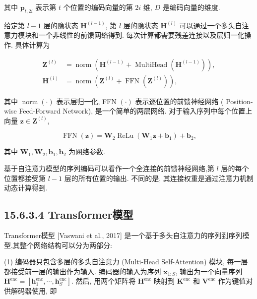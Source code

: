 \documentclass[10pt]{article}
\begin{document}
其中 $\boldsymbol{p}_{t, 2 i}$ 表示第 $t$ 个位置的编码向量的第 $2 i$ 维, $D$ 是编码向量的维度.

给定第 $l-1$ 层的隐状态 $\boldsymbol{H}^{(l-1)}$, 第 $l$ 层的隐状态 $\boldsymbol{H}^{(l)}$ 可以通过一个多头自注意力模块和一个非线性的前馈网络得到. 每次计算都需要残差连接以及层归一化操作. 具体计算为


\begin{align*}
\boldsymbol{Z}^{(l)} & =\operatorname{norm}\left(\boldsymbol{H}^{(l-1)}+\operatorname{MultiHead}\left(\boldsymbol{H}^{(l-1)}\right)\right),  \tag{15.115}\\
\boldsymbol{H}^{(l)} & =\operatorname{norm}\left(\boldsymbol{Z}^{(l)}+\operatorname{FFN}\left(\boldsymbol{Z}^{(l)}\right)\right), \tag{15.116}
\end{align*}


其中 $\operatorname{norm}(\cdot)$ 表示层归一化, FFN $(\cdot)$ 表示逐位置的前馈神经网络 ( Position-wise Feed-Forward Network), 是一个简单的两层网络. 对于输入序列中每个位置上向量 $\boldsymbol{z} \in \boldsymbol{Z}^{(l)}$,


\begin{equation*}
\operatorname{FFN}(\boldsymbol{z})=\boldsymbol{W}_{2} \operatorname{ReLu}\left(\boldsymbol{W}_{1} \boldsymbol{z}+\boldsymbol{b}_{1}\right)+\boldsymbol{b}_{2}, \tag{15.117}
\end{equation*}


其中 $\boldsymbol{W}_{1}, \boldsymbol{W}_{2}, \boldsymbol{b}_{1}, \boldsymbol{b}_{2}$ 为网络参数.

基于自注意力模型的序列编码可以看作一个全连接的前馈神经网络,第 $l$ 层的每个位置都接受第 $l-1$ 层的所有位置的输出. 不同的是, 其连接权重是通过注意力机制动态计算得到.

\subsection*{15.6.3.4 Transformer模型}
Transformer模型 [Vaswani et al., 2017] 是一个基于多头自注意力的序列到序列模型,其整个网络结构可以分为两部分:

(1) 编码器只包含多层的多头自注意力 (Multi-Head Self-Attention) 模块, 每一层都接受前一层的输出作为输入. 编码器的输入为序列 $\boldsymbol{x}_{1: S}$, 输出为一个向量序列 $\boldsymbol{H}^{\mathrm{enc}}=\left[\boldsymbol{h}_{1}^{\mathrm{enc}}, \cdots, \boldsymbol{h}_{S}^{\mathrm{enc}}\right]$. 然后, 用两个矩阵将 $\boldsymbol{H}^{\mathrm{enc}}$ 映射到 $\boldsymbol{K}^{\mathrm{enc}}$ 和 $\boldsymbol{V}^{\mathrm{enc}}$ 作为键值对供解码器使用, 即
\end{document}
